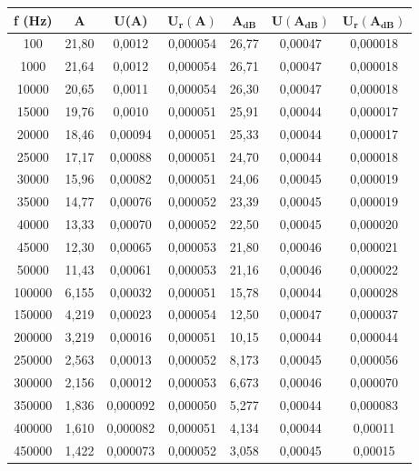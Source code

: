 \begin{table}[!ht]
    \centering
    \begin{tabular}{|c|c|c|c|c|c|c|}
    \hline
        \textbf{f (Hz)} & \textbf{A} & \textbf{U(A)} & $\bm{U_r(A)}$ & $\bm{A_{dB}}$ & $\bm{U(A_{dB})}$ & $\bm{U_r(A_{dB})}$ \\ \hline
        100 & 21,80 & 0,0012 & 0,000054 & 26,77 & 0,00047 & 0,000018 \\ \hline
        1000 & 21,64 & 0,0012 & 0,000054 & 26,71 & 0,00047 & 0,000018 \\ \hline
        10000 & 20,65 & 0,0011 & 0,000054 & 26,30 & 0,00047 & 0,000018 \\ \hline
        15000 & 19,76 & 0,0010 & 0,000051 & 25,91 & 0,00044 & 0,000017 \\ \hline
        20000 & 18,46 & 0,00094 & 0,000051 & 25,33 & 0,00044 & 0,000017 \\ \hline
        25000 & 17,17 & 0,00088 & 0,000051 & 24,70 & 0,00044 & 0,000018 \\ \hline
        30000 & 15,96 & 0,00082 & 0,000051 & 24,06 & 0,00045 & 0,000019 \\ \hline
        35000 & 14,77 & 0,00076 & 0,000052 & 23,39 & 0,00045 & 0,000019 \\ \hline
        40000 & 13,33 & 0,00070 & 0,000052 & 22,50 & 0,00045 & 0,000020 \\ \hline
        45000 & 12,30 & 0,00065 & 0,000053 & 21,80 & 0,00046 & 0,000021 \\ \hline
        50000 & 11,43 & 0,00061 & 0,000053 & 21,16 & 0,00046 & 0,000022 \\ \hline
        100000 & 6,155 & 0,00032 & 0,000051 & 15,78 & 0,00044 & 0,000028 \\ \hline
        150000 & 4,219 & 0,00023 & 0,000054 & 12,50 & 0,00047 & 0,000037 \\ \hline
        200000 & 3,219 & 0,00016 & 0,000051 & 10,15 & 0,00044 & 0,000044 \\ \hline
        250000 & 2,563 & 0,00013 & 0,000052 & 8,173 & 0,00045 & 0,000056 \\ \hline
        300000 & 2,156 & 0,00012 & 0,000053 & 6,673 & 0,00046 & 0,000070 \\ \hline
        350000 & 1,836 & 0,000092 & 0,000050 & 5,277 & 0,00044 & 0,000083 \\ \hline
        400000 & 1,610 & 0,000082 & 0,000051 & 4,134 & 0,00044 & 0,00011 \\ \hline
        450000 & 1,422 & 0,000073 & 0,000052 & 3,058 & 0,00045 & 0,00015 \\ \hline

\end{tabular}
\end{table}
